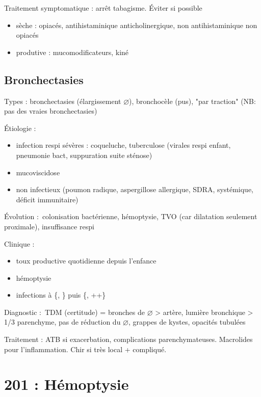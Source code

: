 \documentclass{article}
\begin{document}
Traitement symptomatique : arrêt tabagisme. Éviter si possible
\begin{itemize}
  \item sèche : opiacés, antihistaminique anticholinergique, non
    antihistaminique non opiacés
  \item produtive : mucomodificateurs, kiné
\end{itemize}

\subsection{Bronchectasies}
\label{sub:bronchectasies}
Types : bronchectasies (élargissement $\diameter$), bronchocèle (pus), "par
traction" (NB: pas des vraies bronchectasies)


Étiologie : 
\begin{itemize}
  \item infection respi sévères : coqueluche, tuberculose (virales respi enfant,
    pneumonie bact, suppuration suite sténose)
  \item mucoviscidose
  \item non infectieux (poumon radique, aspergillose allergique, SDRA,
    systémique, déficit immunitaire)
\end{itemize}

Évolution : colonisation bactérienne, hémoptysie, TVO (car dilatation seulement
proximale), insuffisance respi

Clinique :
\begin{itemize}
  \item toux productive quotidienne depuis l'enfance
  \item hémoptysie
  \item infections à \{, \} puis \{,
    ++\}
\end{itemize}

Diagnostic : TDM (certitude) = bronches de $\diameter$ > artère, lumière
bronchique > 1/3 parenchyme, pas de réduction du $\diameter$, grappes de kystes,
opacités tubulées

Traitement : ATB si exacerbation, complications parenchymateuses. Macrolides
pour l'inflammation. Chir si très local + compliqué.

\section{201 : Hémoptysie}%
\label{sec:201_hemoptysie}
\end{document}
